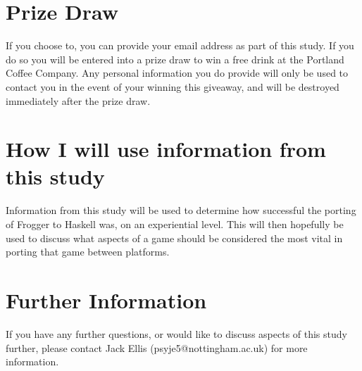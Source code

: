 \documentclass[12pt, a4paper]{report}
\begin{document}
\section{Prize Draw}
If you choose to, you can provide your email address as part of this study.
If you do so you will be entered into a prize draw to win a free drink at the Portland Coffee Company.
Any personal information you do provide will only be used to contact you in the event of your winning this giveaway, and will be destroyed immediately after the prize draw.

\section{How I will use information from this study}
Information from this study will be used to determine how successful the porting of Frogger to Haskell was, on an experiential level.
This will then hopefully be used to discuss what aspects of a game should be considered the most vital in porting that game between platforms.

\section{Further Information}
If you have any further questions, or would like to discuss aspects of this study further, please contact Jack Ellis (psyje5@nottingham.ac.uk) for more information.
\end{document}
